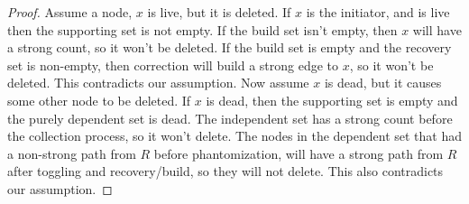 \begin{proof}
Assume a node, $x$ is live, but it is deleted. If $x$ is the initiator,
and is live then the supporting set is not empty. If the build set isn't
empty, then $x$ will have a strong count, so it won't be deleted. If
the build set is empty and the recovery set is non-empty, then correction
will build a strong edge to $x$, so it won't be deleted. This contradicts
our assumption. Now assume $x$ is dead, but it causes some other node to
be deleted. If $x$ is dead, then the supporting set is empty and the purely
dependent set is dead. The independent set has a strong count before the
collection process, so it won't delete. The nodes in the dependent set
that had a non-strong path from $R$ before phantomization, will have a strong
path from $R$ after toggling and recovery/build, so they will not delete. This
also contradicts our assumption.
\end{proof}



